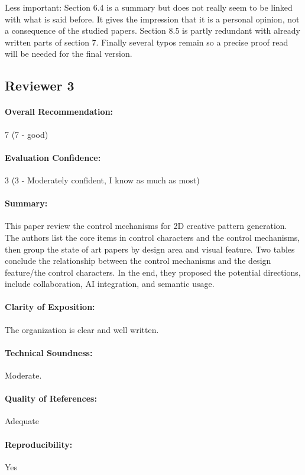 \documentclass{egpubl}
\newcommand{\rev}[2]{{\color{greenrev}\textsuperscript{#1}#2}}
\renewcommand{\rev}[2]{{#2}}
\begin{document}
Less important: Section 6.4 is a summary but does not really seem to be linked with what is said before. It gives the impression that it is a personal opinion, not a consequence of the studied papers. Section 8.5 is partly redundant with already written parts of section 7.
Finally several typos remain so a precise proof read will be needed for the final version.


\rev{Comments}{}


\subsection*{Reviewer 3}

\paragraph*{Overall Recommendation:} 7 (7 - good)
\paragraph*{Evaluation Confidence:} 3 (3 - Moderately confident, I know as much as most)
\paragraph*{Summary:} This paper review the control mechanisms for 2D creative pattern generation. The authors list the core items in control characters and the control mechanisms, then group the state of art papers by design area and visual feature. Two tables conclude the relationship between the control mechanisms and the design feature/the control characters. In the end, they proposed the potential directions, include collaboration, AI integration, and semantic usage. 
\paragraph*{Clarity of Exposition:} The organization is clear and well written.
\paragraph*{Technical Soundness:} Moderate.
\paragraph*{Quality of References:} Adequate
\paragraph*{Reproducibility:} Yes
\end{document}
